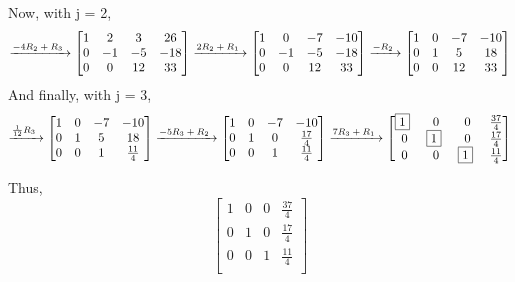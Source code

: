 \documentclass[11pt]{article}
\newcommand{\pivot} {$\boxed{1}$~}
\begin{document}
Now, with j = 2,
\[
\xrightarrow[]{\text{$-4R\textsubscript{2} + R\textsubscript{3}$~}}
    \begin{bmatrix}
    	1 & 2 & 3 & 26 \\
        0 & -1 & -5 & -18 \\
        0 & 0 & 12 & 33\\
	\end{bmatrix}
\xrightarrow[]{\text{$2R\textsubscript{2} + R\textsubscript{1}$~}}
    \begin{bmatrix}
    	1 & 0 & -7 & -10 \\
        0 & -1 & -5 & -18 \\
        0 & 0 & 12 & 33\\
	\end{bmatrix}
\xrightarrow[]{\text{$-R\textsubscript{2}$~}}
    \begin{bmatrix}
    	1 & 0 & -7 & -10 \\
        0 & 1 & 5 & 18 \\
        0 & 0 & 12 & 33\\
	\end{bmatrix}
\]
And finally, with j = 3,
\[
\xrightarrow[]{\text{$\frac{1}{12}R\textsubscript{3} $~}}
    \begin{bmatrix}
    	1 & 0 & -7 & -10 \\
        0 & 1 & 5 & 18 \\
        0 & 0 & 1 & \frac{11}{4}\\
	\end{bmatrix}
\xrightarrow[]{\text{$-5R\textsubscript{3} + R\textsubscript{2}$~}}
    \begin{bmatrix}
    	1 & 0 & -7 & -10 \\
        0 & 1 & 0 & \frac{17}{4} \\
        0 & 0 & 1 & \frac{11}{4}\\
	\end{bmatrix}
\xrightarrow[]{\text{$7R\textsubscript{3} + R\textsubscript{1}$~}}
    \begin{bmatrix}
    	\pivot & 0 & 0 & \frac{37}{4} \\
      0 & \pivot & 0 & \frac{17}{4} \\
      0 & 0 & \pivot & \frac{11}{4}\\
	\end{bmatrix}
\]

\bigskip
Thus,
\[
\begin{bmatrix}
    	1 & 0 & 0 & \frac{37}{4} \\
        0 & 1 & 0 & \frac{17}{4} \\
        0 & 0 & 1 & \frac{11}{4}\\
	\end{bmatrix}
\]
\end{document}
